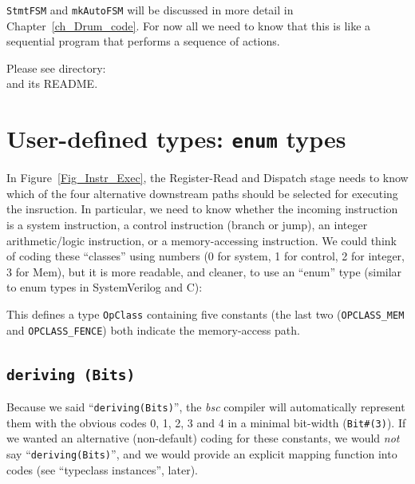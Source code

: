 {\tt StmtFSM} and \verb|mkAutoFSM| will be discussed in more detail in
Chapter~\ref{ch_Drum_code}.  For now all we need to know that this is
like a sequential program that performs a sequence of actions.

\Beginexercise

Please see directory:  \\
and its README.
\Endexercise


\section{User-defined types: {\tt enum} types}

\label{BSV_enum_types}


In Figure~\ref{Fig_Instr_Exec}, the Register-Read and Dispatch stage
needs to know which of the four alternative downstream paths should be
selected for executing the insruction.  In particular, we need to know
whether the incoming instruction is a system instruction, a control
instruction (branch or jump), an integer arithmetic/logic instruction,
or a memory-accessing instruction.  We could think of coding these
``classes'' using numbers (0 for system, 1 for control, 2 for integer,
3 for Mem), but it is more readable, and cleaner, to use an ``enum''
type (similar to enum types in SystemVerilog and C):


This defines a type \verb|OpClass| containing five constants (the last
two (\verb|OPCLASS_MEM| and \verb|OPCLASS_FENCE|) both indicate the
memory-access path.


\subsection{{\tt deriving (Bits)}}


Because we said ``\verb|deriving(Bits)|'', the \emph{bsc} compiler
will automatically represent them with the obvious codes 0, 1, 2, 3
and 4 in a minimal bit-width (\verb|Bit#(3)|).  If we wanted an
alternative (non-default) coding for these constants, we would
\emph{not} say ``\verb|deriving(Bits)|'', and we would provide an
explicit mapping function into codes (see ``typeclass instances'',
later).

